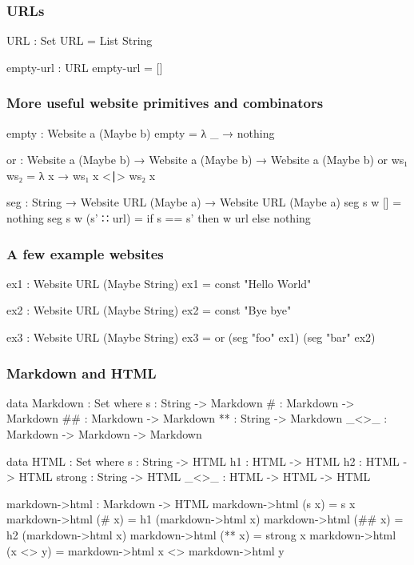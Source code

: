 \documentclass[aspectratio=169]{beamer}
\begin{document}
\begin{frame}
\frametitle{URLs}
\begin{code}
  URL : Set
  URL = List String

  empty-url : URL
  empty-url = []
\end{code}
\end{frame}

\begin{frame}
\frametitle{More useful website primitives and combinators}
\begin{code}
  empty : Website a (Maybe b)
  empty = λ _ → nothing
  
  or : Website a (Maybe b) → Website a (Maybe b) → Website a (Maybe b)
  or ws₁ ws₂ = λ x → ws₁ x <∣> ws₂ x
  
  seg : String → Website URL (Maybe a) → Website URL (Maybe a)
  seg s w [] = nothing
  seg s w (s' ∷ url) = if s == s' then w url else nothing
\end{code}
\end{frame}

\begin{frame}
\frametitle{A few example websites}
\begin{code}
  ex1 : Website URL (Maybe String)
  ex1 = const "Hello World"
  
  ex2 : Website URL (Maybe String)
  ex2 = const "Bye bye"
  
  ex3 : Website URL (Maybe String)
  ex3 = or (seg "foo" ex1)
           (seg "bar" ex2)
\end{code}
\end{frame}

\begin{frame}
\frametitle{Markdown and HTML}
\begin{code}
  data Markdown : Set where
    s : String -> Markdown
    # : Markdown -> Markdown
    ## : Markdown -> Markdown
    ** : String -> Markdown
    _<>_ : Markdown -> Markdown -> Markdown
  
  data HTML : Set where
    s : String -> HTML
    h1 : HTML -> HTML
    h2 : HTML -> HTML
    strong : String -> HTML
    _<>_ : HTML -> HTML -> HTML

  markdown->html : Markdown -> HTML
  markdown->html (s x) = s x
  markdown->html (# x) = h1 (markdown->html x)
  markdown->html (## x) = h2 (markdown->html x)
  markdown->html (** x) = strong x
  markdown->html (x <> y) = markdown->html x <> markdown->html y
\end{code}
\end{frame}
\end{document}
